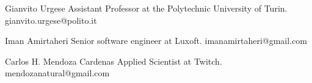

\begin{cvrefs}

    \cvref
    {Gianvito Urgese}
    {Assistant Professor at the Polytechnic University of Turin.}
	{gianvito.urgese@polito.it}

    \cvref
    {Iman Amirtaheri}
    {Senior software engineer at Luxoft.}
	{imanamirtaheri@gmail.com}

    \cvref
    {Carlos H. Mendoza Cardenas}
    {Applied Scientist at Twitch.}
	{mendozanatural@gmail.com}

\end{cvrefs}
